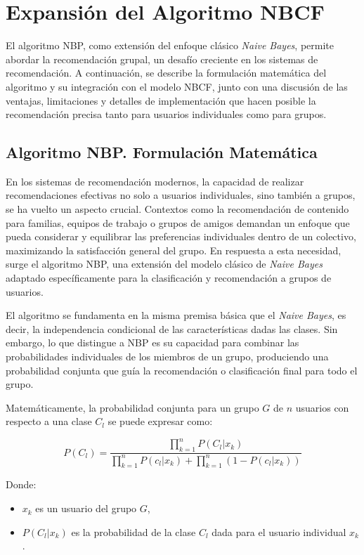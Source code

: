\documentclass[runningheads,a4paper]{llncs}
\begin{document}
\section{Expansión del Algoritmo NBCF}


El algoritmo NBP, como extensión del enfoque clásico 
\textit{Naive Bayes}, permite abordar la recomendación 
grupal, un desafío creciente en los sistemas de 
recomendación. A continuación, se describe la 
formulación matemática del algoritmo y su integración 
con el modelo NBCF, junto con una discusión de las 
ventajas, limitaciones y detalles de implementación 
que hacen posible la recomendación precisa tanto para 
usuarios individuales como para grupos.

\subsection{Algoritmo NBP. Formulación Matemática}
En los sistemas de recomendación modernos, la 
capacidad de realizar recomendaciones efectivas 
no solo a usuarios individuales, sino también a grupos, 
se ha vuelto un aspecto crucial. Contextos como la 
recomendación de contenido para familias, equipos de 
trabajo o grupos de amigos demandan un enfoque que 
pueda considerar y equilibrar las preferencias 
individuales dentro de un colectivo, maximizando la 
satisfacción general del grupo. En respuesta a esta 
necesidad, surge el algoritmo NBP, una extensión del 
modelo clásico de \textit{Naive Bayes} adaptado 
específicamente para la clasificación y recomendación 
a grupos de usuarios.

El algoritmo se fundamenta en la misma premisa básica 
que el \textit{Naive Bayes}, es decir, la independencia 
condicional de las características dadas las clases. 
Sin embargo, lo que distingue a NBP es su capacidad 
para combinar las probabilidades individuales de los 
miembros de un grupo, produciendo una probabilidad 
conjunta que guía la recomendación o clasificación 
final para todo el grupo.

Matemáticamente, la probabilidad conjunta para un 
grupo $G$ de $n$ usuarios con respecto a una clase $C_l$ 
se puede expresar como:

\begin{equation}
    P(C_l) = \frac{\prod_{k=1}^{n} P(C_l|x_k)}{\prod_{k=1}^{n} P(c_l|x_k) + \prod_{k=1}^{n} (1-P(c_l|x_k))}
\end{equation} \cite{nbp}

Donde:
\begin{itemize}
    \item $x_k$ es un usuario del grupo $G$,
    \item $P(C_l|x_k)$ es la probabilidad de la 
    clase $C_l$ dada para el usuario individual $x_k$. 
\end{itemize} 
\end{document}
